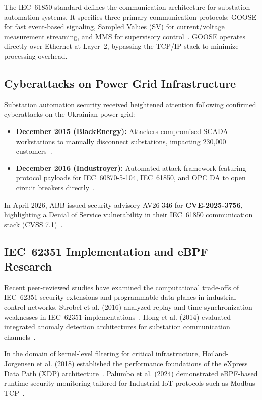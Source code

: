 \documentclass[12pt,a4paper]{article}
\begin{document}
The IEC~61850 standard defines the communication architecture for substation automation systems. It specifies three primary communication protocols: GOOSE for fast event-based signaling, Sampled Values (SV) for current/voltage measurement streaming, and MMS for supervisory control~\cite{iec61850}. GOOSE operates directly over Ethernet at Layer~2, bypassing the TCP/IP stack to minimize processing overhead.

\subsection{Cyberattacks on Power Grid Infrastructure}

Substation automation security received heightened attention following confirmed cyberattacks on the Ukrainian power grid:
\begin{itemize}[noitemsep]
  \item \textbf{December 2015 (BlackEnergy):} Attackers compromised SCADA workstations to manually disconnect substations, impacting 230,000 customers~\cite{ukraine2015}.
  \item \textbf{December 2016 (Industroyer):} Automated attack framework featuring protocol payloads for IEC~60870-5-104, IEC~61850, and OPC DA to open circuit breakers directly~\cite{industroyer}.
\end{itemize}

In April 2026, ABB issued security advisory AV26-346 for \textbf{CVE-2025-3756}, highlighting a Denial of Service vulnerability in their IEC~61850 communication stack (CVSS 7.1)~\cite{cve2025}.

\subsection{IEC~62351 Implementation and eBPF Research}

Recent peer-reviewed studies have examined the computational trade-offs of IEC~62351 security extensions and programmable data planes in industrial control networks. Strobel et al. (2016) analyzed replay and time synchronization weaknesses in IEC~62351 implementations~\cite{strobel2016}. Hong et al. (2014) evaluated integrated anomaly detection architectures for substation communication channels~\cite{hong2014}.

In the domain of kernel-level filtering for critical infrastructure, Hoiland-Jorgensen et al. (2018) established the performance foundations of the eXpress Data Path (XDP) architecture~\cite{ebpf_iot}. Palumbo et al. (2024) demonstrated eBPF-based runtime security monitoring tailored for Industrial IoT protocols such as Modbus TCP~\cite{ebpf_modbus}.
\end{document}
